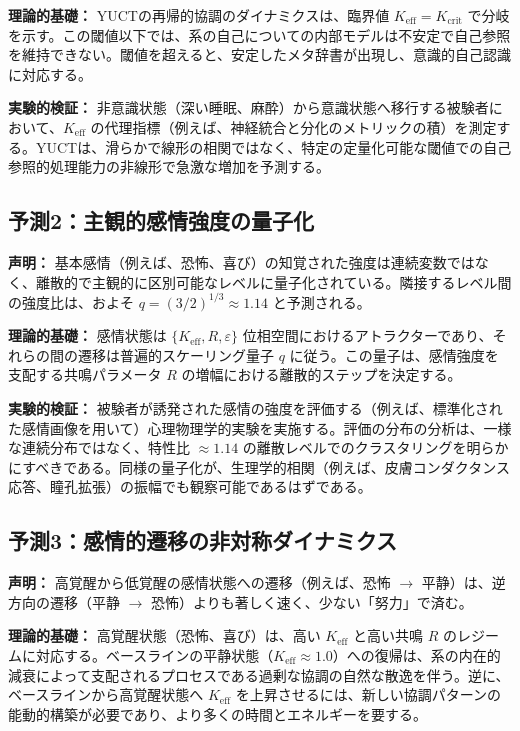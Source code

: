 \documentclass[12pt,a4paper]{article}
\begin{document}
	\textbf{理論的基礎：} YUCTの再帰的協調のダイナミクスは、臨界値 \(K_{\mathrm{eff}} = K_{\mathrm{crit}}\) で分岐を示す。この閾値以下では、系の自己についての内部モデルは不安定で自己参照を維持できない。閾値を超えると、安定したメタ辞書が出現し、意識的自己認識に対応する。
	
	\textbf{実験的検証：} 非意識状態（深い睡眠、麻酔）から意識状態へ移行する被験者において、\(K_{\mathrm{eff}}\) の代理指標（例えば、神経統合と分化のメトリックの積）を測定する。YUCTは、滑らかで線形の相関ではなく、特定の定量化可能な閾値での自己参照的処理能力の非線形で急激な増加を予測する。
	
	\subsection{予測2：主観的感情強度の量子化}
	
	\textbf{声明：} 基本感情（例えば、恐怖、喜び）の知覚された強度は連続変数ではなく、離散的で主観的に区別可能なレベルに量子化されている。隣接するレベル間の強度比は、およそ \(q = (3/2)^{1/3} \approx 1.14\) と予測される。
	
	\textbf{理論的基礎：} 感情状態は \(\{K_{\mathrm{eff}}, R, \varepsilon\}\) 位相空間におけるアトラクターであり、それらの間の遷移は普遍的スケーリング量子 \(q\) に従う。この量子は、感情強度を支配する共鳴パラメータ \(R\) の増幅における離散的ステップを決定する。
	
	\textbf{実験的検証：} 被験者が誘発された感情の強度を評価する（例えば、標準化された感情画像を用いて）心理物理学的実験を実施する。評価の分布の分析は、一様な連続分布ではなく、特性比 \(\approx 1.14\) の離散レベルでのクラスタリングを明らかにすべきである。同様の量子化が、生理学的相関（例えば、皮膚コンダクタンス応答、瞳孔拡張）の振幅でも観察可能であるはずである。
	
	\subsection{予測3：感情的遷移の非対称ダイナミクス}
	
	\textbf{声明：} 高覚醒から低覚醒の感情状態への遷移（例えば、恐怖 \(\rightarrow\) 平静）は、逆方向の遷移（平静 \(\rightarrow\) 恐怖）よりも著しく速く、少ない「努力」で済む。
	
	\textbf{理論的基礎：} 高覚醒状態（恐怖、喜び）は、高い \(K_{\mathrm{eff}}\) と高い共鳴 \(R\) のレジームに対応する。ベースラインの平静状態（\(K_{\mathrm{eff}} \approx 1.0\)）への復帰は、系の内在的減衰によって支配されるプロセスである過剰な協調の自然な散逸を伴う。逆に、ベースラインから高覚醒状態へ \(K_{\mathrm{eff}}\) を上昇させるには、新しい協調パターンの能動的構築が必要であり、より多くの時間とエネルギーを要する。
	
\end{document}
